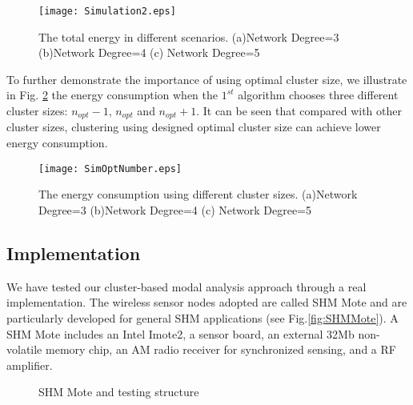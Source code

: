 \begin{figure}
	\centering
		\texttt{[image: Simulation2.eps]}
	\caption{The total energy in different scenarios. (a)Network Degree=3 (b)Network Degree=4 (c) Network Degree=5}
	\label{fig:Simulation2}
\end{figure}

To further demonstrate the importance of using optimal cluster size, we illustrate in Fig. 
\ref{fig:SimOptNumber} the energy consumption when the \(1^{st}\) algorithm chooses three different cluster sizes: \(n_{opt}-1\), \(n_{opt}\) and \(n_{opt}+1\). It can be seen that compared with other cluster sizes, clustering using designed optimal cluster size can achieve lower energy consumption. 

\begin{figure}
	\centering
		\texttt{[image: SimOptNumber.eps]}
	\caption{The energy consumption using different cluster sizes. (a)Network Degree=3 (b)Network Degree=4 (c) Network Degree=5}
	\label{fig:SimOptNumber}
\end{figure}

\subsection{Implementation}
We have tested our cluster-based modal analysis approach through a real implementation. The wireless sensor nodes adopted are called SHM Mote and are particularly developed for general SHM applications (see Fig.\ref{fig:SHMMote}). A SHM Mote includes an Intel Imote2, a sensor board, an external 32Mb non-volatile memory chip, an AM radio receiver for synchronized sensing, and a RF amplifier. 

\begin{figure}
\centering
\subfloat[SHM Mote]{\label{fig:SHMMote}
\texttt{[image: SHMMote.eps]}}
\subfloat[Testing structure]{\label{fig:TestStructure}
\texttt{[image: TestStructure.eps]}}
\subfloat[Network topology]{\label{fig:Testbedtopology}
\texttt{[image: Testbedtopology.eps]}}
\caption{SHM Mote and testing structure}
\label{fig:SHMMOTEandTestStructure}
\end{figure}

